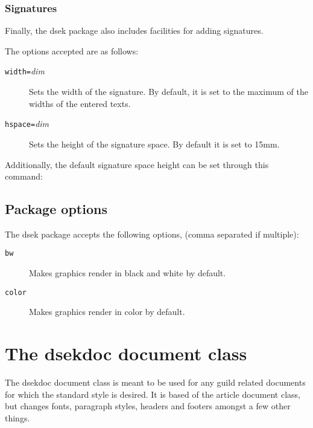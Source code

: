 \documentclass[a4paper, oneside]{ltxdoc}
\begin{document}
\subsubsection{Signatures}
Finally, the \textsf{dsek} package also includes facilities for adding
signatures.

\begin{center}
\end{center}

\noindent
The options accepted are as follows:
\begin{description}
  \item[\texttt{width=}\textlangle\textit{dim}\textrangle] Sets the width of the signature.  By
    default, it is set to the maximum of the widths of the entered texts.
  \item[\texttt{hspace=}\textlangle\textit{dim}\textrangle] Sets the height of the signature space.
    By default it is set to 15mm.
\end{description}

\noindent
Additionally, the default signature space height can be set through this command:
\begin{center}
\end{center}

\subsection{Package options}
The \textsf{dsek} package accepts the following options, (comma separated if
multiple):

\begin{description}
\item[\texttt{bw}] Makes graphics render in black and white by default.
\item[\texttt{color}] Makes graphics render in color by default.
\end{description}

\section{The \textsf{dsekdoc} document class}
The \textsf{dsekdoc} document class is meant to be used for any guild related
documents for which the standard style is desired.  It is based of the
\textsf{article} document class, but changes fonts, paragraph styles, headers
and footers amongst a few other things.
\end{document}
